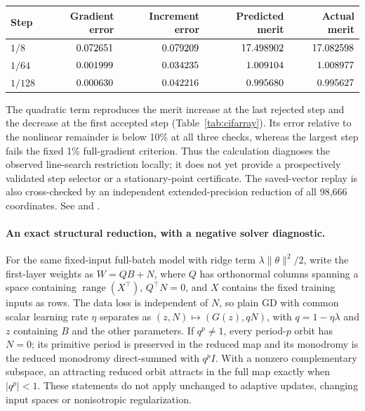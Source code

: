 \documentclass[11pt,letterpaper]{article}
\begin{document}
\par\medskip\noindent\begin{minipage}{\linewidth}
\captionsetup{hypcap=false}
\centering\small
\begin{tabular}{@{}lrrrr@{}}
\toprule
Step & Gradient error & Increment error & Predicted merit & Actual merit \\
\midrule
$1/8$ & $0.072651$ & $0.079209$ & $17.498902$ & $17.082598$ \\
$1/64$ & $0.001999$ & $0.034235$ & $1.009104$ & $1.008977$ \\
$1/128$ & $0.000630$ & $0.042216$ & $0.995680$ & $0.995627$ \\
\bottomrule
\end{tabular}
\label{tab:cifarray}
\end{minipage}\par\medskip

The quadratic term reproduces the merit increase at the last rejected step
and the decrease at the first accepted step (Table~\ref{tab:cifarray}).
Its error relative to the nonlinear remainder is below 10\% at all three
checks, whereas the largest step fails the fixed 1\% full-gradient criterion.
Thus the calculation diagnoses the observed line-search restriction locally;
it does not yet provide a prospectively validated step selector or a
stationary-point certificate. The saved-vector replay is also cross-checked
by an independent extended-precision reduction of all 98,666 coordinates.
See  and
.

\paragraph{An exact structural reduction, with a negative solver diagnostic.}
For the same fixed-input full-batch model with ridge term $\lambda\|\theta\|^2/2$, write the first-layer weights
as $W=QB+N$, where $Q$ has orthonormal columns spanning a space containing $\operatorname{range}(X^\top)$,
$Q^\top N=0$, and $X$ contains the fixed training inputs as rows. The data loss is independent of $N$,
so plain GD with common scalar learning rate $\eta$ separates as $(z,N)\mapsto(G(z),qN)$,
with $q=1-\eta\lambda$ and $z$ containing
$B$ and the other parameters. If $q^p\ne1$, every period-$p$ orbit has $N=0$; its primitive period is
preserved in the reduced map and its monodromy is the reduced monodromy direct-summed with $q^pI$.
With a nonzero complementary subspace, an attracting reduced orbit attracts in the full map exactly when
$|q^p|<1$. These statements do not apply unchanged to adaptive updates,
changing input spaces or nonisotropic regularization.
\end{document}
